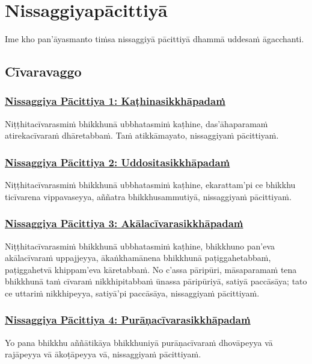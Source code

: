 \section{Nissaggiyapācittiyā}
\label{np}

\begin{intro}
  Ime kho pan'āyasmanto tiṁsa nissaggiyā pācittiyā dhammā uddesaṁ āgacchanti.
\end{intro}

\setsubsecheadstyle{\subsectionFmt}
\subsection{Cīvaravaggo}
\vspace{0.2cm}

\subsubsection*{\hyperref[forf-exp1]{Nissaggiya Pācittiya 1: Kaṭhinasikkhāpadaṁ}}
\label{np1}
Niṭṭhitacīvarasmiṁ bhikkhunā ubbhatasmiṁ kaṭhine, das'āhaparamaṁ atirekacīvaraṁ dhāretabbaṁ. Taṁ atikkāmayato, nissaggiyaṁ pācittiyaṁ.

\subsubsection*{\hyperref[forf-exp2]{Nissaggiya Pācittiya 2: Uddositasikkhāpadaṁ}}
\label{np2}
Niṭṭhitacīvarasmiṁ bhikkhunā ubbhatasmiṁ kaṭhine, ekarattam'pi ce bhikkhu ticīvarena vippavaseyya, aññatra bhikkhusammutiyā, nissaggiyaṁ pācittiyaṁ.

\subsubsection*{\hyperref[forf-exp3]{Nissaggiya Pācittiya 3: Akālacīvarasikkhāpadaṁ}}
\label{np3}
Niṭṭhitacīvarasmiṁ bhikkhunā ubbhatasmiṁ kaṭhine, bhikkhuno pan'eva akālacīvaraṁ uppajjeyya, ākaṅkhamānena bhikkhunā paṭiggahetabbaṁ, paṭiggahetvā khippam'eva kāretabbaṁ. No c'assa pāripūri, māsaparamaṁ tena bhikkhunā taṁ cīvaraṁ nikkhipitabbaṁ ūnassa pāripūriyā, satiyā paccāsāya; tato ce uttariṁ nikkhipeyya, satiyā'pi paccāsāya, nissaggiyaṁ pācittiyaṁ.

\subsubsection*{\hyperref[forf-exp4]{Nissaggiya Pācittiya 4: Purāṇacīvarasikkhāpadaṁ}}
\label{np4}
Yo pana bhikkhu aññātikāya bhikkhuniyā purāṇacīvaraṁ dhovāpeyya vā rajāpeyya vā ākoṭāpeyya vā, nissaggiyaṁ pācittiyaṁ.

